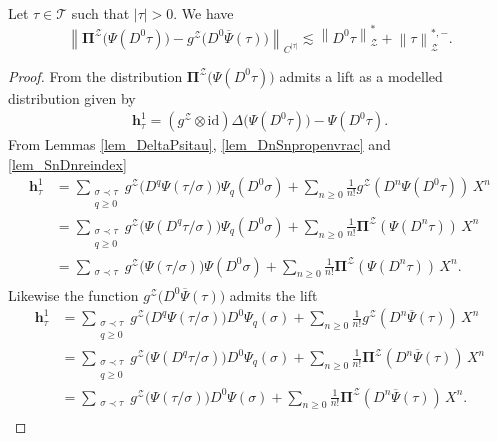 \documentclass[11pt]{preprint}
\def\id{\mathrm{id}}
\newcommand{\mcZ}{\mathcal{Z}}
\newcommand{\mcT}{\mathcal{T}}
\def\PPi{\boldsymbol{\Pi}}
\newcommand{\norme}[1]{\left\lVert #1 \right\lVert}
\begin{document}
\begin{lemma}\label{lem_reconstructionarg_Ztau}
Let $\tau\in\mcT$ such that $|\tau|>0$. We have
$$
\norme{ \PPi^\mcZ\big(\Psi(D^0\tau)\big) - g^\mcZ\big(D^0\overline{\Psi}(\tau)\big) }_{C^{|\tau|}} \lesssim \norme{D^0\tau}_\mcZ^*+ \norme{\tau}^{*,-}_\mcZ.
$$
\end{lemma}
\begin{proof}
	From \cite[Theorem 1]{LocalExpansionsParacSystems} the distribution $\PPi^\mcZ\big(\Psi(D^0\tau)\big)$ admits a lift as a modelled distribution  given by
	\begin{align*}
		{\bm h}_\tau^1 = (g^\mcZ\otimes \id)\Delta\big(\Psi(D^0\tau)\big) - \Psi(D^0\tau).
	\end{align*}
	From Lemmas \ref{lem_DeltaPsitau}, \ref{lem_DnSnpropenvrac} and \ref{lem_SnDnreindex}
	\begin{align*}
		{\bm h}_\tau^1 &= \sum_{\substack{\sigma\prec\tau\\ q\geq0}} g^\mcZ\big(D^q\Psi(\tau/\sigma)  \big) \Psi_q(D^0\sigma) + \sum_{n\geq 0} \frac{1}{n!}g^\mcZ(D^n\Psi(D^0\tau)  ) \, X^n
		\\
		&= \sum_{\substack{\sigma\prec\tau\\ q\geq0}} g^\mcZ\Big(\Psi(D^q\tau/\sigma)  \big) \Psi_q(D^0\sigma) + \sum_{n\geq 0} \frac{1}{n!}\PPi^\mcZ(\Psi(D^n\tau)  ) \, X^n
		\\
			&= \sum_{\substack{\sigma\prec\tau\\ }} g^\mcZ\big(\Psi(\tau/\sigma)  \big) \Psi(D^0\sigma) + \sum_{n\geq 0} \frac{1}{n!}\PPi^\mcZ(\Psi(D^n\tau)  ) \, X^n.
	\end{align*}
	Likewise the function $g^\mcZ\big(D^0\overline{\Psi}(\tau)\big)$ admits the lift 
		\begin{align*}
		{\bm h}_\tau^1 &= \sum_{\substack{\sigma\prec\tau\\ q\geq0}} g^\mcZ\big(D^q\Psi(\tau/\sigma)  \big) D^0\Psi_q(\sigma) + \sum_{n\geq 0} \frac{1}{n!}g^\mcZ(D^n\overline\Psi(\tau)  ) \, X^n
		\\
		&= \sum_{\substack{\sigma\prec\tau\\ q\geq0}} g^\mcZ\big(\Psi(D^q\tau/\sigma)  \big) D^0\Psi_q(\sigma) + \sum_{n\geq 0} \frac{1}{n!}\PPi^\mcZ(D^n\overline\Psi(\tau)  ) \, X^n
		\\
		&= \sum_{\substack{\sigma\prec\tau\\ }} g^\mcZ\big(\Psi(\tau/\sigma)  \big) D^0\Psi(\sigma) + \sum_{n\geq 0} \frac{1}{n!}\PPi^\mcZ(D^n\overline\Psi(\tau)  ) \, X^n.
	\end{align*}

\end{proof}
\end{document}
